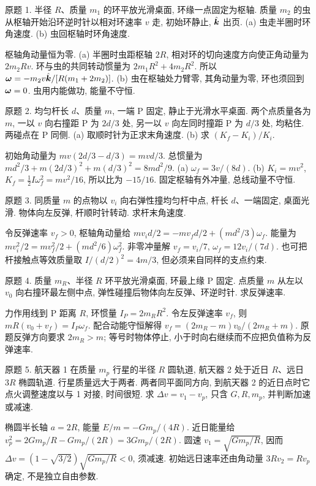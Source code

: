 \begin{exercise}
原题 1. 半径 $R$、质量 $m_1$ 的环平放光滑桌面, 环缘一点固定为枢轴. 质量 $m_2$ 的虫从枢轴开始沿环逆时针以相对环速率 $v$ 走, 初始环静止, $\hat{\boldsymbol{k}}$ 出页. (a) 虫走半圈时环角速度. (b) 虫回枢轴时环角速度.
\end{exercise}
\begin{solution}
枢轴角动量恒为零. (a) 半圈时虫距枢轴 $2R$, 相对环的切向速度方向使正角动量为 $2m_2Rv$. 环与虫的共同转动惯量为 $2m_1R^2+4m_2R^2$. 所以 $\boldsymbol{\omega}=-m_2v\hat{\boldsymbol{k}}/[R(m_1+2m_2)]$. (b) 虫在枢轴处力臂零, 其角动量为零, 环也须回到 $\boldsymbol{\omega}=0$. 虫用内能做功, 能量不守恒.
\end{solution}
\begin{exercise}
原题 2. 均匀杆长 $d$、质量 $m$, 一端 P 固定, 静止于光滑水平桌面. 两个点质量各为 $m$, 一以 $v$ 向右撞距 P 为 $2d/3$ 处, 另一以 $v$ 向左同时撞距 P 为 $d/3$ 处, 均粘住. 两碰点在 P 同侧. (a) 取顺时针为正求末角速度. (b) 求 $(K_f-K_i)/K_i$.
\end{exercise}
\begin{solution}
初始角动量为 $mv(2d/3-d/3)=mvd/3$. 总惯量为 $md^2/3+m(2d/3)^2+m(d/3)^2=8md^2/9$. (a) $\omega_f=3v/(8d)$. (b) $K_i=mv^2$, $K_f=\frac12I\omega_f^2=mv^2/16$, 所以比为 $-15/16$. 固定枢轴有外冲量, 总线动量不守恒.
\end{solution}
\begin{exercise}
原题 3. 同质量 $m$ 的点物以 $v_i$ 向右弹性撞均匀杆中点, 杆长 $d$、一端固定, 桌面光滑. 物体向左反弹, 杆顺时针转动. 求杆末角速度.
\end{exercise}
\begin{solution}
令反弹速率 $v_f>0$, 枢轴角动量给 $mv_i d/2=-mv_f d/2+(md^2/3)\omega_f$. 能量为 $mv_i^2/2=mv_f^2/2+(md^2/6)\omega_f^2$. 非零冲量解 $v_f=v_i/7$, $\omega_f=12v_i/(7d)$. 也可把杆接触点等效质量取 $I/(d/2)^2=4m/3$, 但必须来自同样的支点约束.
\end{solution}
\begin{exercise}
原题 4. 质量 $m_R$、半径 $R$ 环平放光滑桌面, 环最上缘 P 固定. 点质量 $m$ 从左以 $v_0$ 向右撞环最左侧中点, 弹性碰撞后物体向左反弹、环逆时针. 求反弹速率.
\end{exercise}
\begin{solution}
力作用线到 P 距离 $R$, 环惯量 $I_P=2m_RR^2$. 令左反弹速率 $v_f$, 则 $mR(v_0+v_f)=I_P\omega_f$. 配合动能守恒解得 $v_f=(2m_R-m)v_0/(2m_R+m)$. 原题反弹方向要求 $2m_R>m$; 等号时物体停止, 小于时向右继续而不应把负值称为反弹速率.
\end{solution}
\begin{exercise}
原题 5. 航天器 1 在质量 $m_p$ 行星的半径 $R$ 圆轨道, 航天器 2 处于近日 $R$、远日 $3R$ 椭圆轨道. 行星质量远大于两者. 两者同平面同方向, 到航天器 2 的近日点时它点火调整速度以与 1 对接, 时间很短. 求 $\Delta v=v_1-v_p$, 只含 $G,R,m_p$, 并判断加速或减速.
\end{exercise}
\begin{solution}
椭圆半长轴 $a=2R$, 能量 $E/m=-Gm_p/(4R)$. 近日能量给 $v_p^2=2Gm_p/R-Gm_p/(2R)=3Gm_p/(2R)$. 圆速 $v_1=\sqrt{Gm_p/R}$, 因而 $\Delta v=(1-\sqrt{3/2})\sqrt{Gm_p/R}<0$, 须减速. 初始远日速率还由角动量 $3Rv_2=Rv_p$ 确定, 不是独立自由参数.
\end{solution}
